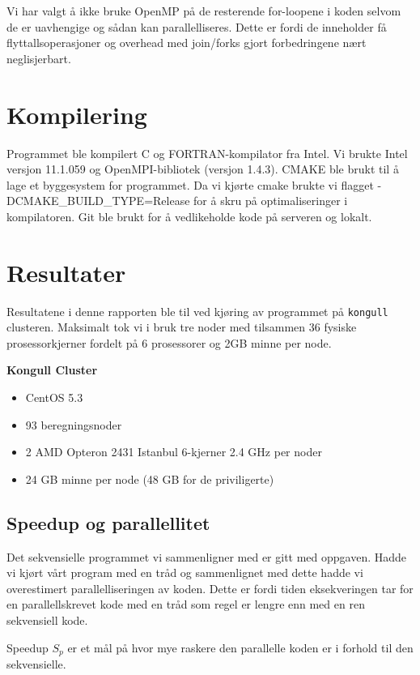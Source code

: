 \documentclass[11pt,norsk,a4paper]{article}
\begin{document}
Vi har valgt å ikke bruke OpenMP på de resterende for-loopene i koden selvom de er uavhengige og sådan kan parallelliseres. Dette er fordi de inneholder få flyttallsoperasjoner og overhead med join/forks gjort forbedringene nært neglisjerbart. 

\section{Kompilering}
Programmet ble kompilert C og FORTRAN-kompilator fra Intel. Vi brukte Intel versjon 11.1.059 og OpenMPI-bibliotek (versjon 1.4.3). CMAKE ble brukt til å lage et byggesystem for programmet. Da vi kjørte cmake brukte vi flagget -DCMAKE\_BUILD\_TYPE=Release for å skru på optimaliseringer i kompilatoren. Git\cite{git} ble brukt for å vedlikeholde kode på serveren og lokalt.

\section{Resultater}
Resultatene i denne rapporten ble til ved kjøring av programmet på \texttt{kongull} clusteren\cite{kongull}. Maksimalt tok vi i bruk tre noder med tilsammen 36 fysiske prosessorkjerner fordelt på 6 prosessorer og 2GB minne per node.

\begin{shaded}
\textbf{Kongull Cluster}\\
\begin{itemize}
\item{CentOS 5.3}
\item{93 beregningsnoder}
\item{2 AMD Opteron 2431 Istanbul 6-kjerner 2.4 GHz per noder}
\item{24 GB minne per node (48 GB for de priviligerte)}
\end{itemize}
\end{shaded}

\subsection{Speedup og parallellitet}
Det sekvensielle programmet vi sammenligner med er gitt med oppgaven. Hadde vi kjørt vårt program med en tråd og sammenlignet med dette hadde vi overestimert parallelliseringen av koden. Dette er fordi tiden eksekveringen tar for en parallellskrevet kode med en tråd som regel er lengre enn med en ren sekvensiell kode. 

Speedup $S_p$ er et mål på hvor mye raskere den parallelle koden er i forhold til den sekvensielle. 
\end{document}
